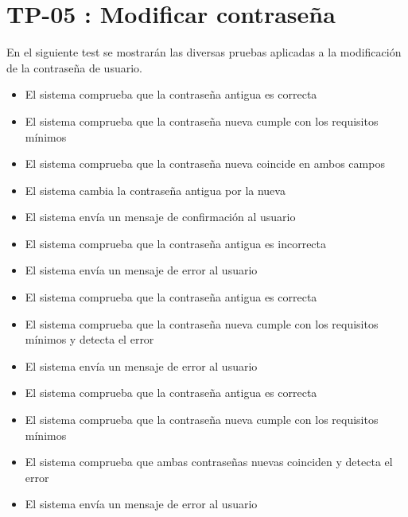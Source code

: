 \section{TP-05 : Modificar contraseña}\label{sect:TP1}

En el siguiente test se mostrarán las diversas pruebas aplicadas a la modificación de la contraseña de usuario.


{
\begin{itemize}
\item El sistema comprueba que la contraseña antigua es correcta
\item El sistema comprueba que la contraseña nueva cumple con los requisitos mínimos
\item El sistema comprueba que la contraseña nueva coincide en ambos campos
\item El sistema cambia la contraseña antigua por la nueva
\item El sistema envía un mensaje de confirmación al usuario
\end{itemize}}{}

{
\begin{itemize}
\item El sistema comprueba que la contraseña antigua es incorrecta
\item El sistema envía un mensaje de error al usuario
\end{itemize}}{}

{
\begin{itemize}
\item El sistema comprueba que la contraseña antigua es correcta
\item El sistema comprueba que la contraseña nueva cumple con los requisitos mínimos y detecta el error
\item El sistema envía un mensaje de error al usuario
\end{itemize}}{}

{
\begin{itemize}
\item El sistema comprueba que la contraseña antigua es correcta
\item El sistema comprueba que la contraseña nueva cumple con los requisitos mínimos
\item El sistema comprueba que ambas contraseñas nuevas coinciden y detecta el error
\item El sistema envía un mensaje de error al usuario
\end{itemize}}{}